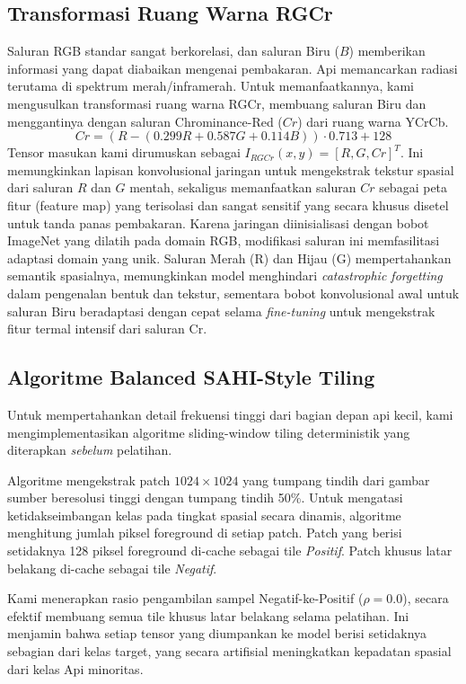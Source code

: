 \documentclass[conference]{IEEEtran}
\begin{document}
\subsection{Transformasi Ruang Warna RGCr}
Saluran RGB standar sangat berkorelasi, dan saluran Biru ($B$) memberikan informasi yang dapat diabaikan mengenai pembakaran. Api memancarkan radiasi terutama di spektrum merah/inframerah. Untuk memanfaatkannya, kami mengusulkan transformasi ruang warna RGCr, membuang saluran Biru dan menggantinya dengan saluran Chrominance-Red ($Cr$) dari ruang warna YCrCb. 
\begin{equation}
    Cr = (R - (0.299R + 0.587G + 0.114B)) \cdot 0.713 + 128
\end{equation}
Tensor masukan kami dirumuskan sebagai $I_{RGCr}(x,y) = [R, G, Cr]^T$. Ini memungkinkan lapisan konvolusional jaringan untuk mengekstrak tekstur spasial dari saluran $R$ dan $G$ mentah, sekaligus memanfaatkan saluran $Cr$ sebagai peta fitur (feature map) yang terisolasi dan sangat sensitif yang secara khusus disetel untuk tanda panas pembakaran. Karena jaringan diinisialisasi dengan bobot ImageNet yang dilatih pada domain RGB, modifikasi saluran ini memfasilitasi adaptasi domain yang unik. Saluran Merah (R) dan Hijau (G) mempertahankan semantik spasialnya, memungkinkan model menghindari \textit{catastrophic forgetting} dalam pengenalan bentuk dan tekstur, sementara bobot konvolusional awal untuk saluran Biru beradaptasi dengan cepat selama \textit{fine-tuning} untuk mengekstrak fitur termal intensif dari saluran Cr.

\subsection{Algoritme Balanced SAHI-Style Tiling}
Untuk mempertahankan detail frekuensi tinggi dari bagian depan api kecil, kami mengimplementasikan algoritme sliding-window tiling deterministik yang diterapkan \textit{sebelum} pelatihan. 

Algoritme mengekstrak patch $1024 \times 1024$ yang tumpang tindih dari gambar sumber beresolusi tinggi dengan tumpang tindih 50\%. Untuk mengatasi ketidakseimbangan kelas pada tingkat spasial secara dinamis, algoritme menghitung jumlah piksel foreground di setiap patch. Patch yang berisi setidaknya 128 piksel foreground di-cache sebagai tile \textit{Positif}. Patch khusus latar belakang di-cache sebagai tile \textit{Negatif}. 

Kami menerapkan rasio pengambilan sampel Negatif-ke-Positif ($\rho = 0.0$), secara efektif membuang semua tile khusus latar belakang selama pelatihan. Ini menjamin bahwa setiap tensor yang diumpankan ke model berisi setidaknya sebagian dari kelas target, yang secara artifisial meningkatkan kepadatan spasial dari kelas Api minoritas.
\end{document}

